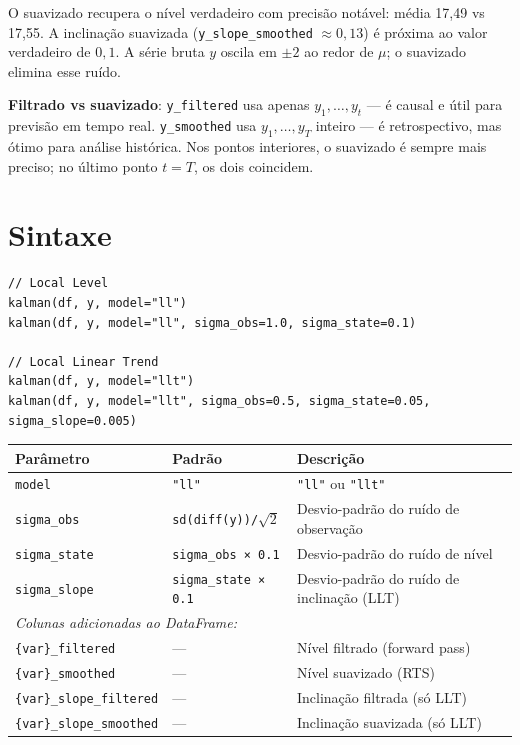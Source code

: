 O suavizado recupera o nível verdadeiro com precisão notável: média 17{,}49
vs 17{,}55. A inclinação suavizada (\texttt{y\_slope\_smoothed} $\approx
0{,}13$) é próxima ao valor verdadeiro de $0{,}1$. A série bruta $y$ oscila
em $\pm 2$ ao redor de $\mu$; o suavizado elimina esse ruído.

\begin{nota}
  \textbf{Filtrado vs suavizado}: \texttt{y\_filtered} usa apenas
  $y_1, \ldots, y_t$ — é causal e útil para previsão em tempo real.
  \texttt{y\_smoothed} usa $y_1, \ldots, y_T$ inteiro — é retrospectivo,
  mas ótimo para análise histórica. Nos pontos interiores, o suavizado
  é sempre mais preciso; no último ponto $t=T$, os dois coincidem.
\end{nota}

\section{Sintaxe}

\begin{lstlisting}
// Local Level
kalman(df, y, model="ll")
kalman(df, y, model="ll", sigma_obs=1.0, sigma_state=0.1)

// Local Linear Trend
kalman(df, y, model="llt")
kalman(df, y, model="llt", sigma_obs=0.5, sigma_state=0.05, sigma_slope=0.005)
\end{lstlisting}

\begin{center}
\begin{tabular}{lll}
\toprule
\textbf{Parâmetro} & \textbf{Padrão} & \textbf{Descrição} \\
\midrule
\texttt{model}       & \texttt{"ll"}         & \texttt{"ll"} ou \texttt{"llt"} \\
\texttt{sigma\_obs}  & \texttt{sd(diff(y))/\(\sqrt{2}\)} & Desvio-padrão do ruído de observação \\
\texttt{sigma\_state}& \texttt{sigma\_obs × 0.1}         & Desvio-padrão do ruído de nível \\
\texttt{sigma\_slope}& \texttt{sigma\_state × 0.1}       & Desvio-padrão do ruído de inclinação (LLT) \\
\midrule
\multicolumn{3}{l}{\textit{Colunas adicionadas ao DataFrame:}} \\
\texttt{\{var\}\_filtered}        & — & Nível filtrado (forward pass) \\
\texttt{\{var\}\_smoothed}        & — & Nível suavizado (RTS) \\
\texttt{\{var\}\_slope\_filtered} & — & Inclinação filtrada (só LLT) \\
\texttt{\{var\}\_slope\_smoothed} & — & Inclinação suavizada (só LLT) \\
\bottomrule
\end{tabular}
\end{center}

